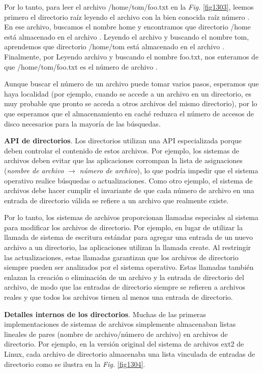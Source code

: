\documentclass[10pt]{book}
\begin{document}
Por lo tanto, para leer el archivo {\mf /home/tom/foo.txt} en la \textit{Fig.} \ref{fig1303}, leemos primero el directorio raíz leyendo el archivo con la bien conocida raíz número {}. En ese archivo, buscamos el nombre {\mf home} y encontramos que directorio {\mf /home} está almacenado en el archivo {}. Leyendo el archivo {} y buscando el nombre {\mf tom}, aprendemos que directorio {\mf /home/tom} está almacenado en el archivo {}. Finalmente, por Leyendo archivo {} y buscando el nombre {\mf foo.txt}, nos enteramos de que {\mf /home/tom/foo.txt} es el número de archivo {}.

Aunque buscar el número de un archivo puede tomar varios pasos, esperamos que haya localidad (por ejemplo, cuando se accede a un archivo en un directorio, es muy probable que pronto se acceda a otros archivos del mismo directorio), por lo que esperamos que el almacenamiento en caché reduzca el número de accesos de disco necesarios para la mayoría de las búsquedas.

\textbf{API de directorios}. Los directorios utilizan una API especializada porque deben controlar el contenido de estos archivos. Por ejemplo, los sistemas de archivos deben evitar que las aplicaciones corrompan la lista de asignaciones (\textit{nombre de archivo} $\rightarrow$ \textit{número de archivo}), lo que podría impedir que el sistema operativo realice búsquedas o actualizaciones. Como otro ejemplo, el sistema de archivos debe hacer cumplir el invariante de que cada número de archivo en una entrada de directorio válida se refiere a un archivo que realmente existe.

Por lo tanto, los sistemas de archivos proporcionan llamadas especiales al sistema para modificar los archivos de directorio. Por ejemplo, en lugar de utilizar la llamada de sistema de escritura estándar para agregar una entrada de un nuevo archivo a un directorio, las aplicaciones utilizan la llamada {\mf create}. Al restringir las actualizaciones, estas llamadas garantizan que los archivos de directorio siempre pueden ser analizados por el sistema operativo. Estas llamadas también enlazan la creación o eliminación de un archivo y la entrada de directorio del archivo, de modo que las entradas de directorio siempre se refieren a archivos reales y que todos los archivos tienen al menos una entrada de directorio.

\textbf{Detalles internos de los directorios}. Muchas de las primeras implementaciones de sistemas de archivos simplemente almacenaban listas lineales de pares (nombre de archivo/número de archivo) en archivos de directorio. Por ejemplo, en la versión original del sistema de archivos ext2 de Linux, cada archivo de directorio almacenaba una lista vinculada de entradas de directorio como se ilustra en la \textit{Fig.} \ref{fig1304}.
\end{document}
